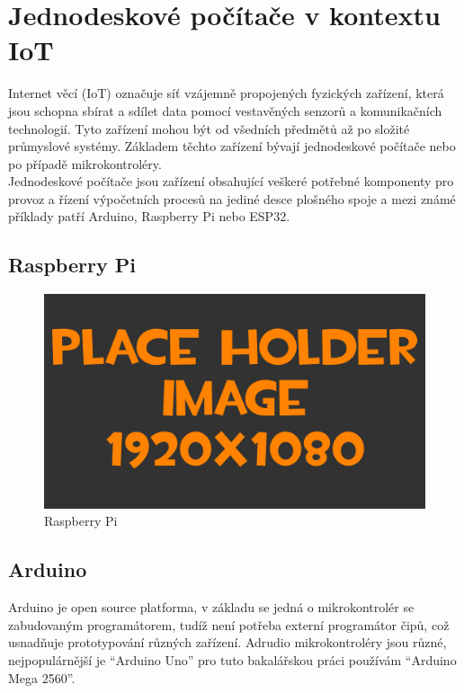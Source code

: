 
\section{Jednodeskové počítače v kontextu IoT}
Internet věcí (IoT) označuje síť vzájemně propojených fyzických zařízení, která jsou schopna sbírat a sdílet data pomocí vestavěných senzorů a komunikačních technologií. Tyto zařízení mohou být od všedních předmětů až po složité průmyslové systémy.
Základem těchto zařízení bývají jednodeskové počítače nebo po případě mikrokontroléry.\\
Jednodeskové počítače jsou zařízení obsahující veškeré potřebné komponenty pro provoz a řízení výpočetních procesů na jediné desce plošného spoje a mezi známé příklady patří Arduino, Raspberry Pi nebo ESP32.\\


\subsection{Raspberry Pi}

\begin{figure}[h!]
	\centering
	\includegraphics[width=\textwidth]{pictures/placeHolderFHD.png}
    	\caption{Raspberry Pi}
   	\label{fig:rasPI}
\end{figure}

\subsection{Arduino}
Arduino je open source platforma, v základu se jedná o mikrokontrolér se zabudovaným programátorem, tudíž není potřeba externí programátor čipů, což usnadňuje prototypování různých zařízení. Adrudio mikrokontroléry jsou různé, nejpopulárnější je “Arduino Uno” pro tuto bakalářskou práci používám “Arduino Mega 2560”.

